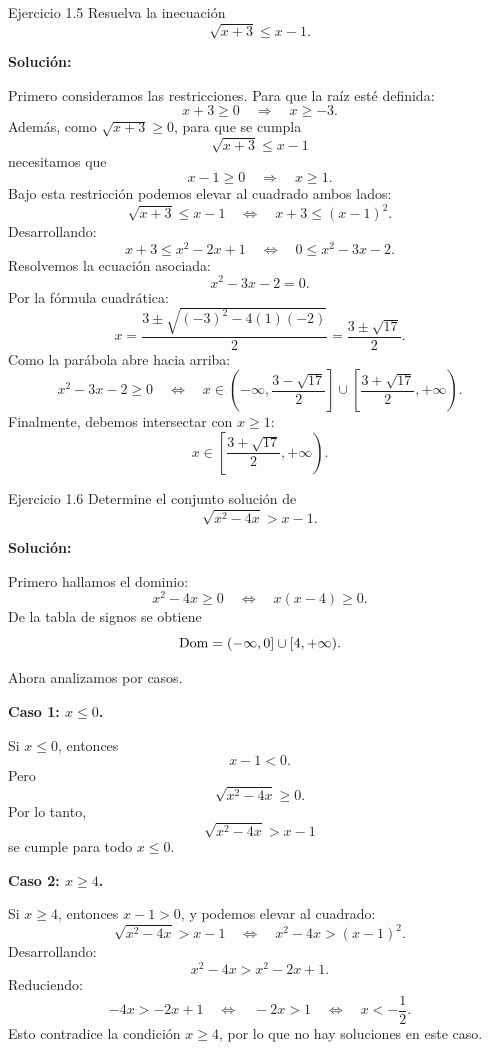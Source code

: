 \documentclass[letterpaper, 12pt]{article}
\begin{document}
\begin{solucionbox}{Ejercicio 1.5}
Resuelva la inecuaci\'on
\[
    \sqrt{x+3}\leq x-1.
\]

\textbf{Soluci\'on:}

Primero consideramos las restricciones. Para que la ra\'iz est\'e definida:
\[
    x+3\geq 0 \quad\Longrightarrow\quad x\geq -3.
\]
Adem\'as, como $\sqrt{x+3}\geq 0$, para que se cumpla
\[
    \sqrt{x+3}\leq x-1
\]
necesitamos que
\[
    x-1\geq 0
    \quad\Longrightarrow\quad
    x\geq 1.
\]
Bajo esta restricci\'on podemos elevar al cuadrado ambos lados:
\[
    \sqrt{x+3}\leq x-1
    \quad\Longleftrightarrow\quad
    x+3\leq (x-1)^2.
\]
Desarrollando:
\[
    x+3\leq x^2-2x+1
    \quad\Longleftrightarrow\quad
    0\leq x^2-3x-2.
\]
Resolvemos la ecuaci\'on asociada:
\[
    x^2-3x-2=0.
\]
Por la f\'ormula cuadr\'atica:
\[
    x=\frac{3\pm\sqrt{(-3)^2-4(1)(-2)}}{2}
     =\frac{3\pm\sqrt{17}}{2}.
\]
Como la par\'abola abre hacia arriba:
\[
    x^2-3x-2\geq 0
    \quad\Longleftrightarrow\quad
    x\in\left(-\infty,\frac{3-\sqrt{17}}{2}\right]\cup
    \left[\frac{3+\sqrt{17}}{2},+\infty\right).
\]
Finalmente, debemos intersectar con $x\geq 1$:
\[
    x\in\left[\frac{3+\sqrt{17}}{2},+\infty\right).
\]

\respuesta{$x\in\left[\dfrac{3+\sqrt{17}}{2},+\infty\right)$.}
\end{solucionbox}

\begin{solucionbox}{Ejercicio 1.6}
Determine el conjunto soluci\'on de
\[
    \sqrt{x^2-4x}>x-1.
\]

\textbf{Soluci\'on:}

Primero hallamos el dominio:
\[
    x^2-4x\geq 0
    \quad\Longleftrightarrow\quad
    x(x-4)\geq 0.
\]
De la tabla de signos se obtiene
\[
    \operatorname{Dom}=\left(-\infty,0\right]\cup[4,+\infty).
\]

Ahora analizamos por casos.

\textbf{Caso 1: $x\leq 0$.}

Si $x\leq 0$, entonces
\[
    x-1<0.
\]
Pero
\[
    \sqrt{x^2-4x}\geq 0.
\]
Por lo tanto,
\[
    \sqrt{x^2-4x}>x-1
\]
se cumple para todo $x\leq 0$.

\textbf{Caso 2: $x\geq 4$.}

Si $x\geq 4$, entonces $x-1>0$, y podemos elevar al cuadrado:
\[
    \sqrt{x^2-4x}>x-1
    \quad\Longleftrightarrow\quad
    x^2-4x>(x-1)^2.
\]
Desarrollando:
\[
    x^2-4x>x^2-2x+1.
\]
Reduciendo:
\[
    -4x>-2x+1
    \quad\Longleftrightarrow\quad
    -2x>1
    \quad\Longleftrightarrow\quad
    x<-\frac12.
\]
Esto contradice la condici\'on $x\geq 4$, por lo que no hay soluciones en este caso.

\respuesta{$x\in(-\infty,0]$.}
\end{solucionbox}
\end{document}
